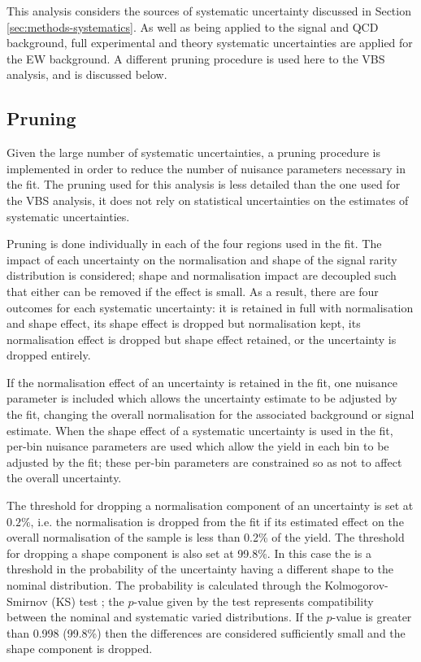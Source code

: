 
This analysis considers the sources of systematic uncertainty discussed in
Section \ref{sec:methods-systematics}. As well as being applied to the signal
and \ac{QCD} \Zy background, full experimental and theory systematic
uncertainties are applied for the \ac{EW} \Zyjj background. A different pruning
procedure is used here to the \ac{VBS} analysis, and is discussed below.


\subsection{Pruning}
Given the large number of systematic uncertainties, a pruning procedure is
implemented in order to reduce the number of nuisance parameters necessary in
the fit. The pruning used for this analysis is less detailed than the one used
for the \ac{VBS} \Zy analysis, it does not rely on statistical uncertainties on
the estimates of systematic uncertainties.

Pruning is done individually in each of the four regions used in the fit.
The impact of each uncertainty on the normalisation and shape of the signal
rarity distribution is considered; shape and normalisation impact are decoupled
such that either can be removed if the effect is small. As a result, there are
four outcomes for each systematic uncertainty: it is retained in full with
normalisation and shape effect, its shape effect is dropped but normalisation
kept, its normalisation effect is dropped but shape effect retained, or the
uncertainty is dropped entirely.

If the normalisation effect of an uncertainty is retained in the fit, one
nuisance parameter is included which allows the uncertainty estimate to be
adjusted by the fit, changing the overall normalisation for the associated
background or signal estimate. When the shape effect of a systematic uncertainty
is used in the fit, per-bin nuisance parameters are used which allow the yield
in each bin to be adjusted by the fit; these per-bin parameters are constrained
so as not to affect the overall uncertainty.

The threshold for dropping a normalisation component of an uncertainty is set at
$0.2\%$, i.e.  the normalisation is dropped from the fit if its estimated effect
on the overall normalisation of the sample is less than 0.2\% of the yield. The
threshold for dropping a shape component is also set at 99.8\%. In this case the
is a threshold in the probability of the uncertainty having a different shape
to the nominal distribution. The probability is calculated through the
Kolmogorov-Smirnov (KS) test \cite{Kolmogoroff1933,Smirnov1939,Massey1951}; the
$p$-value given by the test represents compatibility between the nominal and
systematic varied distributions. If the $p$-value is greater than 0.998 (99.8\%)
then the differences are considered sufficiently small and the shape component
is dropped.

